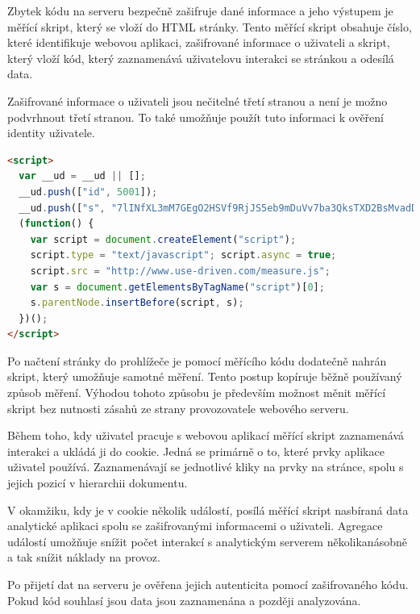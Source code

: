 \documentclass[bc,male,java,dept456]{diploma}						%
\begin{document}
Zbytek kódu na serveru bezpečně zašifruje dané informace a jeho výstupem je měřící skript, který se vloží do HTML stránky. Tento měřící skript obsahuje číslo, které identifikuje webovou aplikaci, zašifrované informace o uživateli a skript, který vloží kód, který zaznamenává uživatelovu interakci se stránkou a odesílá data.

Zašifrované informace o uživateli jsou nečitelné třetí stranou a není je možno podvrhnout třetí stranou. To také umožňuje použít tuto informaci k ověření identity uživatele.

\begin{lstlisting}[label=src:html,caption=Měřící skript,language=HTML]
<script> 
  var __ud = __ud || [];  
  __ud.push(["id", 5001]);
  __ud.push(["s", "7lINfXL3mM7GEgO2HSVf9RjJS5eb9mDuVv7ba3QksTXD2BsMvadDPeU-CoIzid5PDqJI6gCOi0EjmEGtI6XSDbu9at9vY8fw6rwssCDJVA2dfuZYF7kDwzpjzivNO OfAXQls78FzwcjDhc-gxwHohMAa0l9mb7MMlV5JcDDnx7A"]);
  (function() {
    var script = document.createElement("script");
    script.type = "text/javascript"; script.async = true;
    script.src = "http://www.use-driven.com/measure.js";
    var s = document.getElementsByTagName("script")[0]; 
    s.parentNode.insertBefore(script, s);
  })();
</script> 
\end{lstlisting}


Po načtení stránky do prohlížeče je pomocí měřícího kódu dodatečně nahrán skript, který umožňuje samotné měření. Tento postup kopíruje běžně používaný způsob měření. Výhodou tohoto způsobu je především možnost měnit měřící skript bez nutnosti zásahů ze strany provozovatele webového serveru.

Během toho, kdy uživatel pracuje s webovou aplikací měřící skript zaznamenává interakci a ukládá ji do cookie. Jedná se primárně o to, které prvky aplikace uživatel používá. Zaznamenávají se jednotlivé kliky na prvky na stránce, spolu s jejich pozicí v hierarchii dokumentu.

V okamžiku, kdy je v cookie několik událostí, posílá měřící skript nasbíraná data analytické aplikaci spolu se zašifrovanými informacemi o uživateli. Agregace událostí umožňuje snížit počet interakcí s analytickým serverem několikanásobně a tak snížit náklady na provoz.

Po přijetí dat na serveru je ověřena jejich autenticita pomocí zašifrovaného kódu. Pokud kód souhlasí jsou data jsou zaznamenána a později analyzována.
\end{document}
